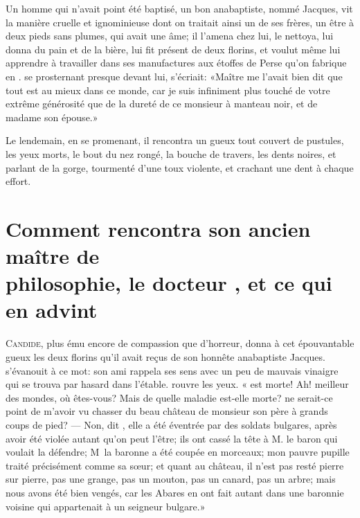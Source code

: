 Un homme qui n’avait point été baptisé, un bon anabaptiste, nommé
Jacques, vit la manière cruelle et 
ignominieuse dont on traitait ainsi
un de ses frères, un être à deux pieds sans plumes, qui avait une âme;
il l’amena chez lui, le nettoya, lui donna du pain et de la bière, lui
fit présent de deux florins, et voulut même lui apprendre à travailler
dans ses manufactures aux étoffes de Perse qu’on fabrique en .
 se prosternant presque devant lui, s’écriait: «Maître 
me l’avait bien dit que tout est au mieux dans ce monde, car je suis
infiniment plus touché de votre extrême générosité que de la dureté de
ce monsieur à manteau noir, et de madame son épouse.»

Le lendemain, en se promenant, il rencontra un gueux tout couvert de
pustules, les yeux morts, le bout du nez rongé, la bouche de travers,
les dents noires, et parlant de la gorge, tourmenté d’une toux
violente, et crachant une dent à chaque effort.





\chapter[Comment \bname{Candide} rencontra…]{Comment  rencontra son ancien maître de\\ philosophie, le docteur
, et ce qui en advint}


\lettrine{C}{andide}, plus ému encore de compassion que d’horreur, donna à cet
épouvantable gueux les deux florins qu’il avait reçus de son honnête 
anabaptiste Jacques.  
s’évanouit à ce mot: son ami rappela ses sens avec un peu de mauvais
vinaigre qui se trouva par hasard dans l’étable.  rouvre les
yeux. « est morte! Ah! meilleur des mondes, où êtes-vous? Mais
de quelle maladie est-elle morte? ne serait-ce point de m’avoir vu
chasser du beau château de monsieur son père à grands coups de pied?
— Non, dit , elle a été éventrée par des soldats bulgares, après
avoir été violée autant qu’on peut l’être; ils ont cassé la tête à
M. le baron qui voulait la défendre; M~la baronne a été
coupée en morceaux; mon pauvre pupille traité précisément comme sa
sœur; et quant au château, il n’est pas resté pierre sur pierre, pas
une grange, pas un mouton, pas un canard, pas un arbre; mais nous avons
été bien vengés, car les Abares en ont fait autant dans une baronnie
voisine qui appartenait à un seigneur bulgare.»

